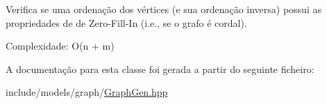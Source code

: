 Verifica se uma ordenação dos vértices (e sua ordenação inversa) possui as propriedades de de Zero-\/\+Fill-\/\+In (i.\+e., se o grafo é cordal).

Complexidade\+: O(n + m) 

A documentação para esta classe foi gerada a partir do seguinte ficheiro\+:\begin{DoxyCompactItemize}
\item 
include/models/graph/\hyperlink{GraphGen_8hpp}{Graph\+Gen.\+hpp}\end{DoxyCompactItemize}
